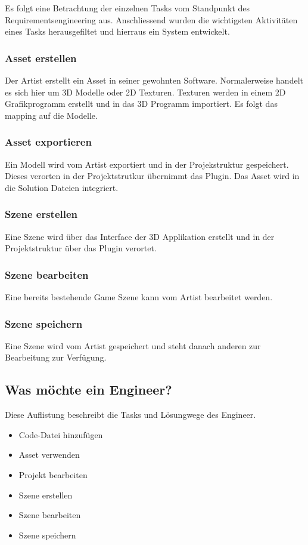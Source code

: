 \documentclass[pagesize, paper=a4, fontsize=12pt, titlepage=true, headings=small, headnosepline, abstractoff, liststotoc, nochapterprefix, plainheadsepline, twoside]{scrreprt}
\begin{document}
Es folgt eine Betrachtung der einzelnen Tasks vom Standpunkt des Requirementsengineering aus. Anschliessend wurden die wichtigsten Aktivitäten eines Tasks herausgefiltet und hierraus ein System entwickelt.

\subsubsection{Asset erstellen}
Der Artist erstellt ein Asset in seiner gewohnten Software. Normalerweise handelt es sich hier um 3D Modelle oder 2D Texturen. Texturen werden in einem 2D Grafikprogramm erstellt und  in das 3D Programm importiert. Es folgt das mapping auf die Modelle.

\subsubsection{Asset exportieren}
Ein Modell wird vom Artist exportiert und in der Projekstruktur gespeichert. Dieses verorten in der Projektstrutkur übernimmt das Plugin. Das Asset wird in die Solution Dateien integriert.

\subsubsection{Szene erstellen}
Eine Szene wird über das Interface der 3D Applikation erstellt und in der Projektstruktur über das Plugin verortet.

\subsubsection{Szene bearbeiten}
Eine bereits bestehende Game Szene kann vom Artist bearbeitet werden.

\subsubsection{Szene speichern}
Eine Szene wird vom Artist gespeichert und steht danach anderen zur Bearbeitung zur Verfügung.

\subsection{Was möchte ein Engineer?}
Diese Auflistung beschreibt die Tasks und Lösungwege des Engineer.
\begin{itemize}
\item Code-Datei hinzufügen
\item Asset verwenden
\item Projekt bearbeiten
\item Szene erstellen
\item Szene bearbeiten
\item Szene speichern
\end{itemize}
\end{document}
